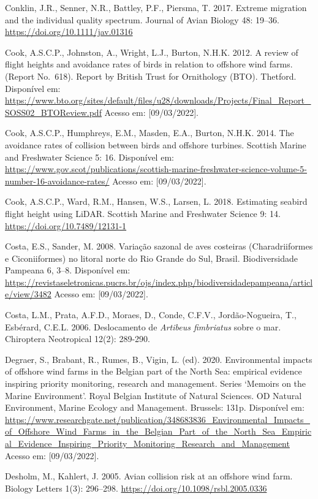 \documentclass[
  oneside]{scrbook}
\begin{document}
Conklin, J.R., Senner, N.R., Battley, P.F., Piersma, T. 2017. Extreme migration and the individual quality spectrum. Journal of Avian Biology 48: 19--36. \url{https://doi.org/10.1111/jav.01316}

Cook, A.S.C.P., Johnston, A., Wright, L.J., Burton, N.H.K. 2012. A review of flight heights and avoidance rates of birds in relation to offshore wind farms. (Report No.~618). Report by British Trust for Ornithology (BTO). Thetford. Disponível em: \url{https://www.bto.org/sites/default/files/u28/downloads/Projects/Final_Report_SOSS02_BTOReview.pdf} Acesso em: {[}09/03/2022{]}.

Cook, A.S.C.P., Humphreys, E.M., Masden, E.A., Burton, N.H.K. 2014. The avoidance rates of collision between birds and offshore turbines. Scottish Marine and Freshwater Science 5: 16. Disponível em: \url{https://www.gov.scot/publications/scottish-marine-freshwater-science-volume-5-number-16-avoidance-rates/} Acesso em: {[}09/03/2022{]}.

Cook, A.S.C.P., Ward, R.M., Hansen, W.S., Larsen, L. 2018. Estimating seabird flight height using LiDAR. Scottish Marine and Freshwater Science 9: 14. \url{https://doi.org/10.7489/12131-1}

Costa, E.S., Sander, M. 2008. Variação sazonal de aves costeiras (Charadriiformes e Ciconiiformes) no litoral norte do Rio Grande do Sul, Brasil. Biodiversidade Pampeana 6, 3--8. Disponível em: \url{https://revistaseletronicas.pucrs.br/ojs/index.php/biodiversidadepampeana/article/view/3482} Acesso em: {[}09/03/2022{]}.

Costa, L.M., Prata, A.F.D., Moraes, D., Conde, C.F.V., Jordão-Nogueira, T., Esbérard, C.E.L. 2006. Deslocamento de \emph{Artibeus fimbriatus} sobre o mar. Chiroptera Neotropical 12(2): 289-290.

Degraer, S., Brabant, R., Rumes, B., Vigin, L. (ed). 2020. Environmental impacts of offshore wind farms in the Belgian part of the North Sea: empirical evidence inspiring priority monitoring, research and management. Series `Memoirs on the Marine Environment'. Royal Belgian Institute of Natural Sciences. OD Natural Environment, Marine Ecology and Management. Brussels: 131p. Disponível em: \url{https://www.researchgate.net/publication/348683836_Environmental_Impacts_of_Offshore_Wind_Farms_in_the_Belgian_Part_of_the_North_Sea_Empirical_Evidence_Inspiring_Priority_Monitoring_Research_and_Management} Acesso em: {[}09/03/2022{]}.

Desholm, M., Kahlert, J. 2005. Avian collision risk at an offshore wind farm. Biology Letters 1(3): 296--298. \url{https://doi.org/10.1098/rsbl.2005.0336}
\end{document}
